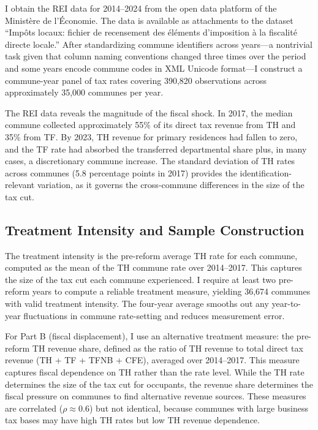\documentclass[12pt]{article}
\begin{document}
I obtain the REI data for 2014--2024 from the open data platform of the Minist\`ere de l'\'Economie. The data is available as attachments to the dataset ``Imp\^ots locaux: fichier de recensement des \'el\'ements d'imposition \`a la fiscalit\'e directe locale.'' After standardizing commune identifiers across years---a nontrivial task given that column naming conventions changed three times over the period and some years encode commune codes in XML Unicode format---I construct a commune-year panel of tax rates covering 390,820 observations across approximately 35,000 communes per year.

The REI data reveals the magnitude of the fiscal shock. In 2017, the median commune collected approximately 55\% of its direct tax revenue from TH and 35\% from TF. By 2023, TH revenue for primary residences had fallen to zero, and the TF rate had absorbed the transferred departmental share plus, in many cases, a discretionary commune increase. The standard deviation of TH rates across communes (5.8 percentage points in 2017) provides the identification-relevant variation, as it governs the cross-commune differences in the size of the tax cut.

\subsection{Treatment Intensity and Sample Construction}

The treatment intensity is the pre-reform average TH rate for each commune, computed as the mean of the TH commune rate over 2014--2017. This captures the size of the tax cut each commune experienced. I require at least two pre-reform years to compute a reliable treatment measure, yielding 36,674 communes with valid treatment intensity. The four-year average smooths out any year-to-year fluctuations in commune rate-setting and reduces measurement error.

For Part B (fiscal displacement), I use an alternative treatment measure: the pre-reform TH revenue share, defined as the ratio of TH revenue to total direct tax revenue (TH + TF + TFNB + CFE), averaged over 2014--2017. This measure captures fiscal dependence on TH rather than the rate level. While the TH rate determines the size of the tax cut for occupants, the revenue share determines the fiscal pressure on communes to find alternative revenue sources. These measures are correlated ($\rho \approx 0.6$) but not identical, because communes with large business tax bases may have high TH rates but low TH revenue dependence.
\end{document}
